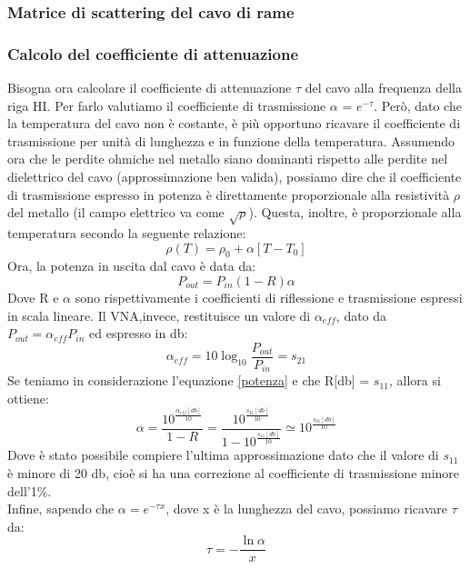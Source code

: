 \subsubsection{Matrice di scattering del cavo di rame}

\subsubsection{Calcolo del coefficiente di attenuazione}
Bisogna ora calcolare il coefficiente di attenuazione $\tau$ del cavo alla frequenza della riga HI. Per farlo valutiamo il coefficiente di trasmissione $\alpha$ = $e^{-\tau}$. Però, dato che la temperatura del cavo non è costante, è più opportuno ricavare il coefficiente di trasmissione per unità di lunghezza e in funzione della temperatura. Assumendo ora che le perdite ohmiche nel metallo siano dominanti rispetto alle perdite nel dielettrico del cavo (approssimazione ben valida), possiamo dire che il coefficiente di trasmissione espresso in potenza è direttamente proporzionale alla resistività $\rho$ del metallo (il campo elettrico va come $\sqrt{\rho}$). Questa, inoltre, è proporzionale alla temperatura secondo la seguente relazione:
\begin{equation}
    \rho(T)=\rho_{0}+\alpha[T-T_{0}]
\end{equation}
Ora, la potenza in uscita dal cavo è data da:
\begin{equation}
    P_{out}=P_{in}(1-R)\alpha
    \label{potenza}
\end{equation}
Dove R e $\alpha$ sono rispettivamente i coefficienti di riflessione e trasmissione espressi in scala lineare. 
Il VNA,invece, restituisce un valore di $\alpha_{eff}$, dato da $P_{out}=\alpha_{eff}P_{in}$ ed espresso in db:
\begin{equation}
    \alpha_{eff}=10\log_{10}\frac{P_{out}}{P_{in}}=s_{21}
\end{equation}
Se teniamo in considerazione l'equazione \eqref{potenza} e che R[db] 
=  $s_{11}$, allora si ottiene:
\begin{equation}
    \alpha=\frac{10^{\frac{\alpha_{eff}[db]}{10}}}{1-R}=\frac{10^{\frac{s_{21}[db]}{10}}}{1-10^{\frac{s_{11}[db]}{10}}}\simeq10^{\frac{s_{21}[db]}{10}}
\end{equation}
Dove è stato possibile compiere l'ultima approssimazione dato che il valore di $s_{11}$ è minore di 20 db, cioè si ha una correzione al coefficiente di trasmissione minore dell'1$\%$.\\
Infine, sapendo che $\alpha = e^{-\tau x}$, dove x è la lunghezza del cavo, possiamo ricavare $\tau$ da:
\begin{equation}
    \tau=-\frac{\ln{\alpha}}{x}
\end{equation}


